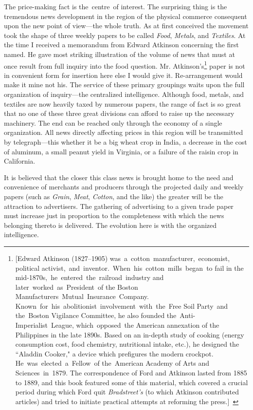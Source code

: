 \documentclass[twoside,symmetric,nobib,justified]{tufte-book}
\begin{document}
The price-making fact is the~centre~of interest. The surprising thing is
the tremendous news development in the region of the physical commerce
consequent upon the new point of view---the whole truth. As at first
conceived the movement took the shape of three weekly papers to be
called \emph{Food}, \emph{Metals}, and \emph{Textiles}. At the time I
received a memorandum from Edward Atkinson concerning the first named.
He gave most striking illustration of the volume of news that must at
once result from full inquiry into the food question. Mr.
Atkinson's\footnote{{[}Edward Atkinson (1827--1905)
  was~a~cotton~manufacturer,~economist, political
  activist,~and~inventor.~When~his~cotton~mills~began~to fail in the
  mid-1870s,~he~entered~the~railroad~industry and
  later~worked~as~President~of the Boston
  Manufacturers~Mutual~Insurance~Company.
  Known~for~his~abolitionist~involvement~with~the~Free Soil Party~and
  the~Boston Vigilance Committee, he also founded
  the~Anti-Imperialist~League, which~opposed~the American annexation of
  the Philippines in the late 1890s. Based on an in-depth study of
  cooking (energy consumption cost, food chemistry, nutritional intake,
  etc.), he designed the ``Aladdin Cooker," a device which prefigures
  the modern crockpot. He~was~elected~a~Fellow~of the~American Academy
  of Arts and Sciences~in~1879. The correspondence of Ford and Atkinson
  lasted from 1885 to 1889, and this book featured some of this
  material, which covered a crucial period during which Ford quit
  \emph{Bradstreet's} (to which Atkinson contributed articles) and tried
  to initiate practical attempts at reforming the press.{]}~} paper is
not in convenient form for insertion here else I would give it.
Re-arrangement would make it mine not his. The service of these primary
groupings waits upon the full organization of inquiry---the centralized
intelligence. Although food, metals, and textiles are now heavily taxed
by numerous papers, the range of fact is so great that no one of these
three great divisions can afford to raise up the necessary machinery.
The end can be reached only through the economy of a single
organization. All news directly affecting prices in this region will be
transmitted by telegraph---this whether it be a big wheat crop in India,
a decrease in the cost of aluminum, a small peanut yield in Virginia, or
a failure of the raisin crop in California.~

It is believed that the closer this class news is brought home to the
need and convenience of merchants and producers through the projected
daily and weekly papers (such as \emph{Grain}, \emph{Meat},
\emph{Cotton}, and the like) the greater will be the attraction to
advertisers. The gathering of advertising to a given trade paper must
increase just in proportion to the completeness with which the news
belonging thereto is delivered. The evolution here is with the organized
intelligence.~
\end{document}
